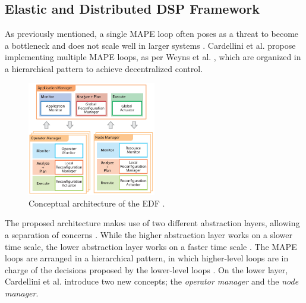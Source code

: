         \subsection{Elastic and Distributed DSP Framework}
        \label{sub:edf}
        As previously mentioned, a single MAPE loop often poses as a threat to become a bottleneck and does not scale well in larger systems \cite{cardellini}.
        Cardellini et al. propose implementing multiple MAPE loops, as per Weyns et al. \cite{Weyns2013}, which are organized in a hierarchical pattern to achieve decentralized control.
        \begin{figure}[hbt]
            \centering
            \includegraphics[width=0.5\textwidth]{Bilder/hierarchical.png}
            \caption{
                    Conceptual architecture of the EDF \cite[p. 175]{cardellini}.
            }
            \label{fig:hierarchical}
        \end{figure}
        The proposed architecture makes use of two different abstraction layers, allowing a separation of concerns \cite[p. 175]{cardellini}. 
        While the higher abstraction layer works on a slower time scale, the lower abstraction layer works on a faster time scale \cite[p. 175]{cardellini}.
        The MAPE loops are arranged in a hierarchical pattern, in which higher-level loops are in charge of the decisions proposed by the lower-level loops \cite[p. 175]{cardellini}.
        On the lower layer, Cardellini et al. introduce two new concepts; the \textit{operator manager} and the \textit{node manager}.

